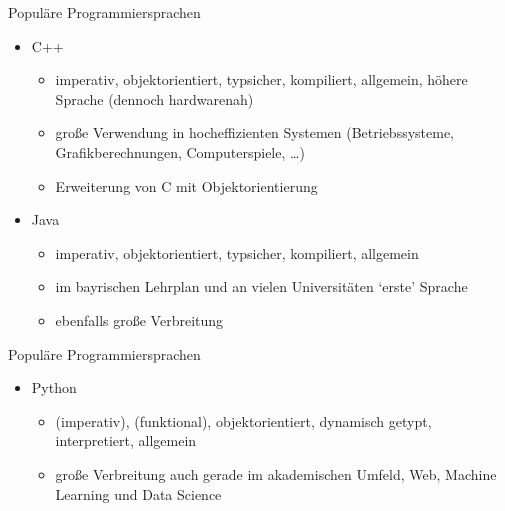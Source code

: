 \begin{frame}{Populäre Programmiersprachen}
    \begin{itemize}
        \item C++
            \begin{itemize}
                \item imperativ, objektorientiert, typsicher, kompiliert, allgemein,
                höhere Sprache (dennoch hardwarenah)
                \item große Verwendung in hocheffizienten Systemen 
                (Betriebssysteme, Grafikberechnungen, Computerspiele, \dots)
                \item Erweiterung von C mit Objektorientierung
            \end{itemize}
        \item Java
            \begin{itemize}
                \item imperativ, objektorientiert, typsicher, kompiliert, allgemein
                \item im bayrischen Lehrplan und an vielen Universitäten 
                `erste' Sprache
                \item ebenfalls große Verbreitung
            \end{itemize}
        \end{itemize}
    \end{frame}
\begin{frame}{Populäre Programmiersprachen}
\begin{itemize}
        \item Python
            \begin{itemize}
                \item (imperativ), (funktional), objektorientiert, 
                dynamisch getypt, interpretiert, allgemein
                \item große Verbreitung auch gerade im akademischen Umfeld, 
                Web, Machine Learning und Data Science
            \end{itemize}
    \end{itemize}
\end{frame}

